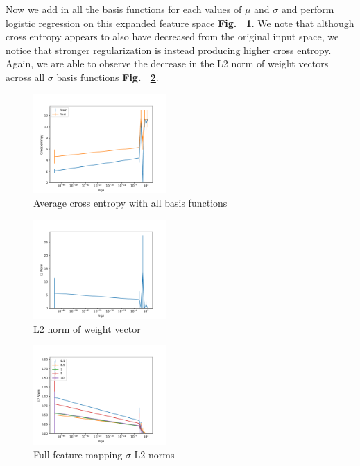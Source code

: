 \documentclass[11pt]{amsart}
\begin{document}
Now we add in all the basis functions for each values of $\mu$ and $\sigma$ and perform logistic regression on this expanded feature space {\bf Fig. ~\ref{fig:q1g}}. We note that although cross entropy appears to also have decreased from the original input space, we notice that stronger regularization is instead producing higher cross entropy. Again, we are able to observe the decrease in the L2 norm of weight vectors across all $\sigma$ basis functions {\bf Fig. ~\ref{fig:q1f_sigmanorms}}.

\begin{figure}[h]
	\centering
		\includegraphics[width=0.45\textwidth]{all_sigmas.pdf}
		\caption{Average cross entropy with all basis functions}
		\label{fig:q1g}
\end{figure}

\begin{figure}
		\includegraphics[width=0.45\textwidth]{all_sigmas_norm.pdf}
		\caption{L2 norm of weight vector}
\end{figure}

\begin{figure}[h!]
	\centering
	\includegraphics[width=0.45\textwidth]{all_sigma_norms.pdf}
	\caption{Full feature mapping $\sigma$ L2 norms}
	\label{fig:q1f_sigmanorms}
\end{figure}
\end{document}
